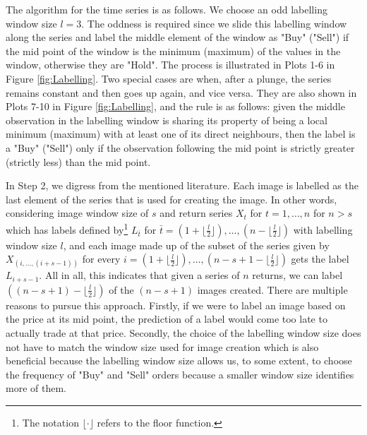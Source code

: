 \documentclass[11pt, a4paper]{article}
\begin{document}
The algorithm for the time series is as follows. We choose an odd labelling window size $l = 3$. The oddness is required since we slide this labelling window along the series and label the middle element of the window as "Buy" ("Sell") if the mid point of the window is the minimum (maximum) of the values in the window, otherwise they are "Hold". The process is illustrated in Plots 1-6 in Figure \ref{fig:Labelling}. 
Two special cases are when, after a plunge, the series remains constant and then goes up again, and vice versa. They are also shown in Plots 7-10 in Figure \ref{fig:Labelling}, and the rule is as follows: 
given the middle observation in the labelling window is sharing its property of being a local minimum (maximum) with at least one of its direct neighbours, then the label is a "Buy" ("Sell") only if the observation following the mid point is strictly greater (strictly less) than the mid point.

In Step 2, we digress from the mentioned literature. Each image is labelled as the last element of the series that is used for creating the image. In other words, considering image window size of $s$ and return series $X_t$ for $t = 1, \dots, n$ for $n > s$ which has labels defined by\footnote{The notation $\lfloor \cdot \rfloor$ refers to the floor function.} 
$L_{\bar{t}}$ for 
$\bar{t} = \left(1+\lfloor \frac{l}{2} \rfloor\right), \dots, \left(n-\lfloor \frac{l}{2} \rfloor\right)$ with labelling window size $l$, and each image made up of the subset of the series given by
$X_{(i,\dots,(i+s-1))}$  
for every
$i = \left(1+\lfloor \frac{l}{2} \rfloor\right), \dots, \left(n-s+1-\lfloor \frac{l}{2} \rfloor\right)$ gets the label $L_{i+s-1}$. All in all, this indicates that given a series of $n$ returns, we can label $\left((n - s + 1)-\lfloor \frac{l}{2} \rfloor\right)$ of the $(n - s + 1)$ images created.
There are multiple reasons to pursue this approach. Firstly, if we were to label an image based on the price at its mid point, the prediction of a label would come too late to actually trade at that price. Secondly, the choice of the labelling window size does not have to match the window size used for image creation which is also beneficial because the labelling window size allows us, to some extent, to choose the frequency of "Buy" and "Sell" orders because a smaller window size identifies more of them. 
\end{document}

